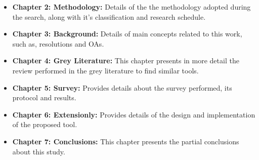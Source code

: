 \begin{itemize}
    \item  \textbf{Chapter 2: Methodology:} Details of the the methodology adopted during the search, along with it's classification and research schedule.
    \item  \textbf{Chapter 3: Background:} Details of main concepts related to this work, such as, resolutions and \acp{OA}.
    \item  \textbf{Chapter 4: Grey Literature:} This chapter presents in more detail the review performed in the grey literature to find similar tools.
    \item  \textbf{Chapter 5: Survey:} Provides details about the survey performed, its protocol and results.
    \item  \textbf{Chapter 6: Extensionly:} Provides details of the design and implementation
of the proposed tool.
    \item  \textbf{Chapter 7: Conclusions:} This chapter presents the partial conclusions about this study.
\end{itemize}



